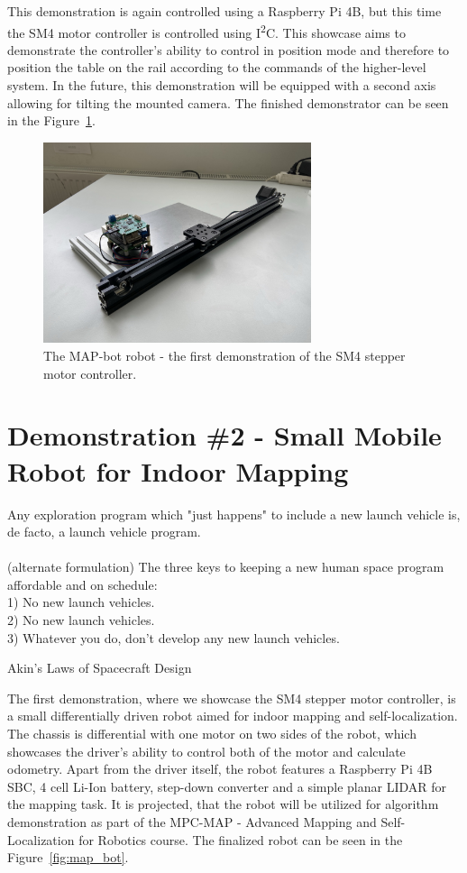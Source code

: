 This demonstration is again controlled using a Raspberry Pi 4B, but this time the SM4 motor controller is controlled using I\textsuperscript{2}C.
This showcase aims to demonstrate the controller's ability to control in position mode and therefore to position the table on the rail according to the commands of the higher-level system.
In the future, this demonstration will be equipped with a second axis allowing for tilting the mounted camera.
The finished demonstrator can be seen in the Figure~\ref{fig:rail_demonstrator}.

\begin{figure}[H]
    \centering
    \includegraphics[width=0.7\textwidth]{obrazky/rail}
    \caption{The MAP-bot robot - the first demonstration of the SM4 stepper motor controller.}
    \label{fig:rail_demonstrator}
\end{figure}

\section{Demonstration \#2 - Small Mobile Robot for Indoor Mapping}
\label{sec:dem1}
\epigraph{
    Any exploration program which "just happens" to include a new launch vehicle is, de facto, a launch vehicle program. \\ \\
    (alternate formulation) The three keys to keeping a new human space program affordable and on schedule: \\
1)  No new launch vehicles. \\
2)  No new launch vehicles. \\
3)  Whatever you do, don't develop any new launch vehicles.}{Akin's Laws of Spacecraft Design\cite{akin_akins_nodate}}

The first demonstration, where we showcase the SM4 stepper motor controller, is a small differentially driven robot aimed for indoor mapping and self-localization.
The chassis is differential with one motor on two sides of the robot, which showcases the driver's ability to control both of the motor and calculate odometry.
Apart from the driver itself, the robot features a Raspberry Pi 4B SBC, 4 cell Li-Ion battery, step-down converter and a simple planar LIDAR for the mapping task.
It is projected, that the robot will be utilized for algorithm demonstration as part of the MPC-MAP - Advanced Mapping and Self-Localization for Robotics course.
The finalized robot can be seen in the Figure~\ref{fig:map_bot}.


